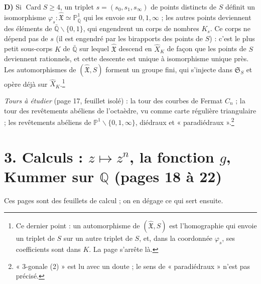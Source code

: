 \documentclass[11pt,a4paper]{article}
\begin{document}
\textbf{D)} Si $\operatorname{Card} S \geqslant 4$, un triplet $s = (s_{0},
s_{1}, s_{\infty})$ de points distincts de $S$ définit un isomorphisme
$\varphi_{s} : \hat{\mathfrak{X}} \simeq \mathbb{P}^{1}_{\bar{\mathbb{Q}}}$ qui
les envoie sur $0, 1, \infty$ ; les autres points deviennent des éléments de
$\bar{\mathbb{Q}} \smallsetminus \{0, 1\}$, qui engendrent un corps de nombres
$K_{s}$. Ce corps ne dépend pas de $s$ (il est engendré par les birapports des
points de $S$) : c'est le plus petit sous-corps $K$ de $\bar{\mathbb{Q}}$ sur
lequel $\hat{\mathfrak{X}}$ descend en $\hat{X}_{K}$ de façon que les points
de $S$ deviennent rationnels, et cette descente est unique à isomorphisme
unique près. Les automorphismes de $(\hat{\mathfrak{X}}, S)$ forment un groupe
fini, qui s'injecte dans $\mathfrak{S}_{S}$ et opère déjà sur
$\hat{X}_{K}$.\footnote{Ce dernier point : un automorphisme de
$(\hat{\mathfrak{X}}, S)$ est l'homographie qui envoie un triplet de $S$ sur un
autre triplet de $S$, et, dans la coordonnée $\varphi_{s}$, ses coefficients
sont dans $K$. La page s'arrête là.}

\emph{Tours à étudier} (page 17, feuillet isolé) : la tour des courbes de
Fermat $C_{n}$ ; la tour des revêtements abéliens de l'octaèdre, vu comme
carte régulière triangulaire ; les revêtements abéliens de $\mathbb{P}^{1}
\smallsetminus \{0, 1, \infty\}$, diédraux et « paradiédraux ».\footnote{« 3-gonale
(2) » est lu avec un doute ; le sens de « paradiédraux » n'est pas précisé.}

\section*{3. Calculs : $z \mapsto z^{n}$, la fonction $g$, Kummer sur $\mathbb{Q}$
(pages 18 à 22)}

Ces pages sont des feuillets de calcul ; on en dégage ce qui sert ensuite.
\end{document}
